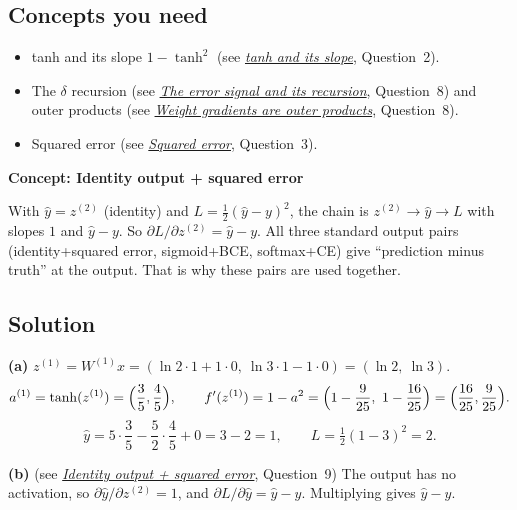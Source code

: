\documentclass[12pt,a4paper]{article}
\newcommand{\concept}[2]{\par\medskip\phantomsection\label{#1}{\large\bfseries\color{blue!50!black} Concept: #2}\par}
\newcommand{\seeconcept}[3]{(see \hyperref[#1]{\textit{#2}}, Question~#3)}
\begin{document}
\subsection*{Concepts you need}
\begin{itemize}[nosep]
\item tanh and its slope $1-\tanh^2$ \seeconcept{c:tanh}{tanh and its slope}{2}.
\item The $\delta$ recursion \seeconcept{c:delta}{The error signal and its recursion}{8} and outer products \seeconcept{c:outer}{Weight gradients are outer products}{8}.
\item Squared error \seeconcept{c:sqerr}{Squared error}{3}.
\end{itemize}

\concept{c:identityhead}{Identity output + squared error}
With $\hat y=z^{(2)}$ (identity) and $L=\tfrac12(\hat y-y)^2$, the chain is $z^{(2)}\to\hat y\to L$ with slopes $1$ and $\hat y-y$. So $\partial L/\partial z^{(2)}=\hat y-y$. All three standard output pairs (identity+squared error, sigmoid+BCE, softmax+CE) give ``prediction minus truth'' at the output. That is why these pairs are used together.

\subsection*{Solution}
\textbf{(a)} $z^{(1)}=W^{(1)}x=(\ln2\cdot1+1\cdot0,\ \ln3\cdot1-1\cdot0)=(\ln2,\ \ln3)$.
\[
a^{(1)}=\tanh(z^{(1)})=\Bigl(\frac35,\frac45\Bigr),\qquad f'(z^{(1)})=1-a^2=\Bigl(1-\frac9{25},\ 1-\frac{16}{25}\Bigr)=\Bigl(\frac{16}{25},\frac9{25}\Bigr).
\]
\[
\hat y=5\cdot\frac35-\frac52\cdot\frac45+0=3-2=1,\qquad L=\tfrac12(1-3)^2=2 .
\]

\textbf{(b)} \seeconcept{c:identityhead}{Identity output + squared error}{9} The output has no activation, so $\partial\hat y/\partial z^{(2)}=1$, and $\partial L/\partial\hat y=\hat y-y$. Multiplying gives $\hat y-y$.
\end{document}
